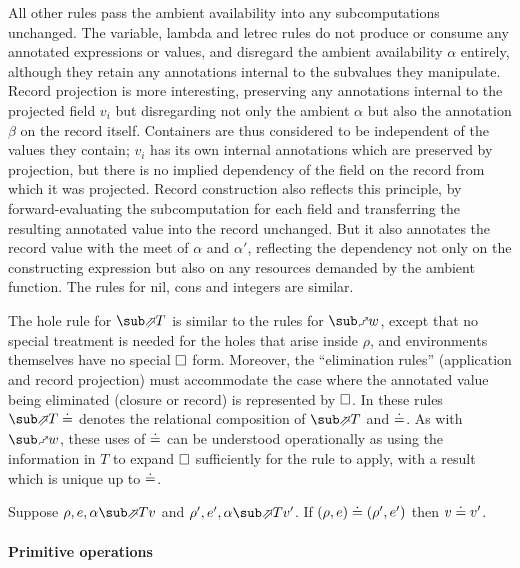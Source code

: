 All other rules pass the ambient availability into any subcomputations unchanged. The variable, lambda and letrec rules do not produce or consume any annotated expressions or values, and disregard the ambient availability $\alpha$ entirely, although they retain any annotations internal to the subvalues they manipulate. Record projection is more interesting, preserving any annotations internal to the projected field $v_i$ but disregarding not only the ambient $\alpha$ but also the annotation $\beta$ on the record itself. Containers are thus considered to be independent of the values they contain; $v_i$ has its own internal annotations which are preserved by projection, but there is no implied dependency of the field on the record from which it was projected. Record construction also reflects this principle, by forward-evaluating the subcomputation for each field and transferring the resulting annotated value into the record unchanged. But it also annotates the record value with the meet of $\alpha$ and $\alpha'$, reflecting the dependency not only on the constructing expression but also on any resources demanded by the ambient function. The rules for nil, cons and integers are similar.


The hole rule for $\evalFwdF{T}$ is similar to the rules for $\matchFwdF{w}$, except that no special treatment is needed for the holes that arise inside $\rho$, and environments themselves have no special $\square$ form. Moreover, the ``elimination rules'' (application and record projection) must accommodate the case where the annotated value being eliminated (closure or record) is represented by $\square$. In these rules $\evalFwdR{T}\eq$ denotes the relational composition of $\evalFwdR{T}$ and $\doteq$. As with $\matchFwdF{w}$, these uses of $\doteq$ can be understood operationally as using the information in $T$ to expand $\square$ sufficiently for the rule to apply, with a result which is unique up to $\doteq$.

\begin{lemma}
   Suppose $\rho, e, \alpha \evalFwdR{T} v$ and $\rho', e', \alpha \evalFwdR{T} v'$. If $(\rho, e) \doteq (\rho', e')$ then $v \doteq v'$.
\end{lemma}

\paragraph{Primitive operations}

